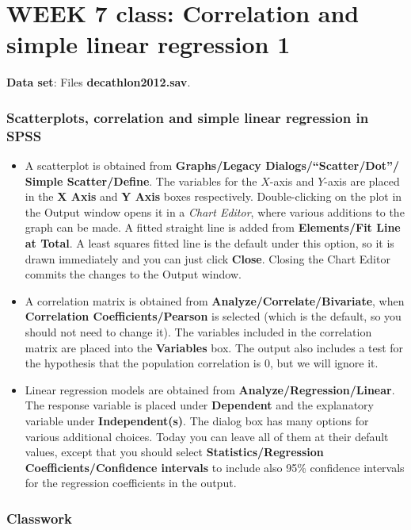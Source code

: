 \newpage

\section[Week 8: Correlation and simple linear regression 1]{WEEK 7 class: Correlation and simple linear regression 1}

\textbf{Data set}: Files \textbf{decathlon2012.sav}.

\subsubsection{Scatterplots, correlation and simple linear
regression in SPSS}

\begin{itemize}
\item
A scatterplot is obtained from \textbf{Graphs/Legacy
Dialogs/``Scatter/Dot''/ Simple Scatter/Define}.
The variables for the $X$-axis and $Y$-axis are placed in the \textbf{X
Axis} and \textbf{Y Axis} boxes respectively. Double-clicking on the
plot in the Output window opens it in a \emph{Chart Editor}, where
various additions to the graph can be made. A fitted
straight line is added from \textbf{Elements/Fit Line at Total}.
A least squares fitted line is the default under this option, so it is
drawn immediately and you can just click \textbf{Close}. Closing the
Chart Editor commits the changes to the Output window.
\item
A correlation matrix is obtained from
\textbf{Analyze/Correlate/Bivariate}, when \textbf{Correlation
Coefficients/Pearson} is selected (which is the default, so you should
not need to change it). The variables included in the correlation
matrix are placed into the \textbf{Variables} box. The output also
includes a test for the hypothesis that the population correlation
is 0, but we will ignore it.
\item
Linear regression models are obtained from
\textbf{Analyze/Regression/Linear}. The response variable is placed
under \textbf{Dependent} and the explanatory variable under
\textbf{Independent(s)}. The dialog box has many options for various
additional choices. Today you can leave all of them at their default
values, except that you should select \textbf{Statistics/Regression
Coefficients/Confidence intervals} to include also 95\% confidence intervals
for the regression coefficients in the output.
\end{itemize}

\subsubsection{Classwork}

